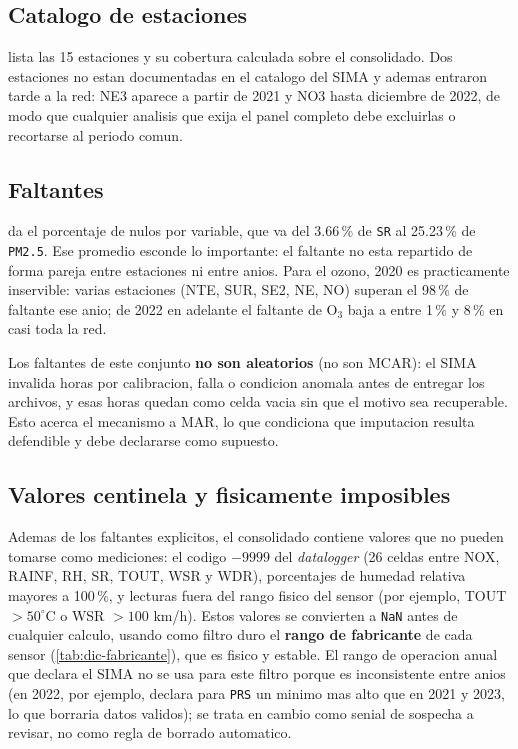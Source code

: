 \subsection{Catalogo de estaciones}\label{sec:dic:estaciones}

 lista las 15 estaciones y su cobertura calculada
sobre el consolidado. Dos estaciones no estan documentadas en el catalogo del
SIMA y ademas entraron tarde a la red: NE3 aparece a partir de 2021 y NO3
hasta diciembre de 2022, de modo que cualquier analisis que exija el panel
completo debe excluirlas o recortarse al periodo comun.

\subsection{Faltantes}\label{sec:dic:faltantes}

 da el porcentaje de nulos por variable, que va del
3.66\,\% de \texttt{SR} al 25.23\,\% de \texttt{PM2.5}. Ese promedio esconde lo
importante: el faltante no esta repartido de forma pareja entre estaciones ni
entre anios. Para el ozono, 2020 es practicamente inservible: varias
estaciones (NTE, SUR, SE2, NE, NO) superan el 98\,\% de faltante ese anio; de
2022 en adelante el faltante de O$_3$ baja a entre 1\,\% y 8\,\% en casi toda
la red.

Los faltantes de este conjunto \textbf{no son aleatorios} (no son MCAR): el
SIMA invalida horas por calibracion, falla o condicion anomala antes de
entregar los archivos, y esas horas quedan como celda vacia sin que el motivo
sea recuperable. Esto acerca el mecanismo a MAR, lo que condiciona que
imputacion resulta defendible y debe declararse como supuesto.

\subsection{Valores centinela y fisicamente imposibles}\label{sec:dic:centinela}

Ademas de los faltantes explicitos, el consolidado contiene valores que no
pueden tomarse como mediciones: el codigo $-9999$ del \emph{datalogger} (26
celdas entre NOX, RAINF, RH, SR, TOUT, WSR y WDR), porcentajes de humedad
relativa mayores a 100\,\%, y lecturas fuera del rango fisico del sensor (por
ejemplo, TOUT $>50^{\circ}$C o WSR $>100$ km/h). Estos valores se convierten a
\texttt{NaN} antes de cualquier calculo, usando como filtro duro el
\textbf{rango de fabricante} de cada sensor (\cref{tab:dic-fabricante}), que es
fisico y estable. El rango de operacion anual que declara el SIMA no se usa
para este filtro porque es inconsistente entre anios (en 2022, por ejemplo,
declara para \texttt{PRS} un minimo mas alto que en 2021 y 2023, lo que
borraria datos validos); se trata en cambio como senial de sospecha a
revisar, no como regla de borrado automatico.

